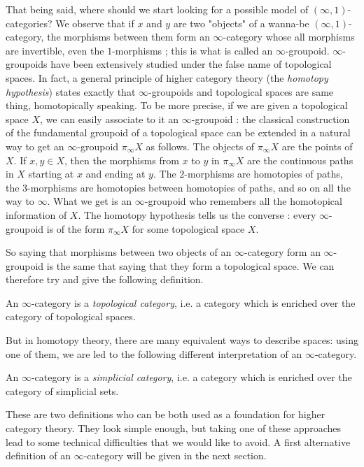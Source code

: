 \begin{refsection}
That being said, where should we start looking for a possible model of $(\infty,1)$-categories? We observe that if $x$ and $y$ are two "objects" of a wanna-be $(\infty,1)$-category, the morphisms between them form an $\infty$-category whose all morphisms are invertible, even the $1$-morphisms ; this is what is called an $\infty$-groupoid.
$\infty$-groupoids have been extensively studied under the false name of topological spaces. In fact, a general principle of higher category theory (the \emph{homotopy hypothesis}) states exactly that $\infty$-groupoids and topological spaces are same thing, homotopically speaking. To be more precise, if we are given a topological space $X$, we can easily associate to it an $\infty$-groupoid : the classical construction of the fundamental groupoid of a topological space can be extended in a natural way to get an $\infty$-groupoid $\pi_{\infty}X$ as follows. The objects of $\pi_{\infty}X$ are the points of $X$. If $x,y \in X$, then the morphisms from $x$ to $y$ in $\pi_{\infty}X$ are the continuous paths in $X$ starting at $x$ and ending at $y$. The $2$-morphisms are homotopies of paths, the $3$-morphisms are homotopies between homotopies of paths, and so on all  the way to $\infty$. What we get is an $\infty$-groupoid who remembers all the homotopical information of $X$. The homotopy hypothesis tells us the converse : every $\infty$-groupoid is of the form $\pi_{\infty}X$ for some topological space $X$.

So saying that morphisms between two objects of an $\infty$-category form an $\infty$-groupoid is the same that saying that they form a topological space. We can therefore try and give the following definition.

\begin{defin}
An $\infty$-category is a \emph{topological category}, i.e. a category which is enriched over the category of topological spaces.
\end{defin}

But in homotopy theory, there are many equivalent ways to describe spaces: using one of them, we are led to the following different interpretation of an $\infty$-category.

\begin{defin}
An $\infty$-category is a \emph{simplicial category}, i.e. a category which is enriched over the category of simplicial sets.
\end{defin}

These are two definitions who can be both used as a foundation for higher category theory. They look simple enough, but taking one of these approaches lead to some technical difficulties that we would like to avoid. A first alternative definition of an $\infty$-category will be given in the next section.


\end{refsection}
